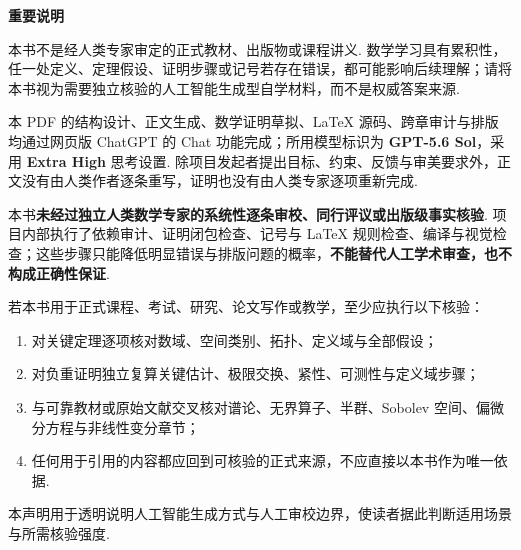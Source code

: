 \cleardoublepage
{}
{}

{\FAKai\color{FARose}\noindent\textbf{重要说明}\par}
\smallskip
本书不是经人类专家审定的正式教材、出版物或课程讲义. 数学学习具有累积性，任一处定义、定理假设、证明步骤或记号若存在错误，都可能影响后续理解；请将本书视为需要独立核验的人工智能生成型自学材料，而不是权威答案来源.

本 PDF 的结构设计、正文生成、数学证明草拟、LaTeX 源码、跨章审计与排版均通过网页版 ChatGPT 的 Chat 功能完成；所用模型标识为 \textbf{GPT-5.6 Sol}，采用 \textbf{Extra High} 思考设置. 除项目发起者提出目标、约束、反馈与审美要求外，正文没有由人类作者逐条重写，证明也没有由人类专家逐项重新完成.

本书\textbf{未经过独立人类数学专家的系统性逐条审校、同行评议或出版级事实核验}. 项目内部执行了依赖审计、证明闭包检查、记号与 LaTeX 规则检查、编译与视觉检查；这些步骤只能降低明显错误与排版问题的概率，\textbf{不能替代人工学术审查，也不构成正确性保证}.

若本书用于正式课程、考试、研究、论文写作或教学，至少应执行以下核验：
\begin{enumerate}[leftmargin=2.2em,itemsep=.35em,topsep=.35em]
  \item 对关键定理逐项核对数域、空间类别、拓扑、定义域与全部假设；
  \item 对负重证明独立复算关键估计、极限交换、紧性、可测性与定义域步骤；
  \item 与可靠教材或原始文献交叉核对谱论、无界算子、半群、Sobolev 空间、偏微分方程与非线性变分章节；
  \item 任何用于引用的内容都应回到可核验的正式来源，不应直接以本书作为唯一依据.
\end{enumerate}

\vfill
{\FAKai\small\color{FASlate}本声明用于透明说明人工智能生成方式与人工审校边界，使读者据此判断适用场景与所需核验强度.\par}
